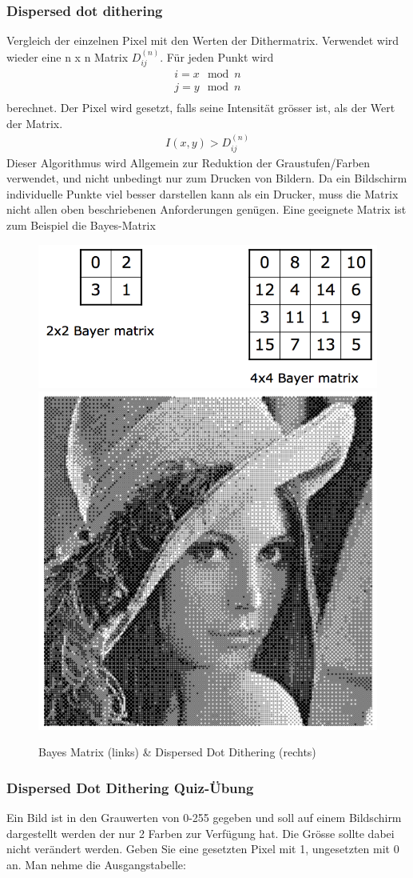 \subsubsection{Dispersed dot dithering} 
Vergleich der einzelnen Pixel mit den Werten der Dithermatrix.
Verwendet wird wieder eine n x n Matrix \(D_{ij}^{(n)}\). Für jeden Punkt wird
\begin{gather*}
i = x \mod n\\
j = y \mod n\\
\end{gather*}                                           
berechnet. Der Pixel wird gesetzt, falls seine Intensität grösser ist, als der Wert der Matrix.
\begin{gather*}
I(x,y) > D_{ij}^{(n)}   
\end{gather*}
Dieser Algorithmus wird Allgemein zur Reduktion der Graustufen/Farben verwendet, und nicht unbedingt nur zum Drucken von Bildern. Da ein Bildschirm individuelle Punkte viel besser darstellen kann als ein Drucker, muss die Matrix nicht allen oben beschriebenen Anforderungen genügen. Eine geeignete Matrix ist zum Beispiel die Bayes-Matrix
\begin{figure}[!ht]
\centering
\includegraphics[width=0.5\linewidth]{fig/bayesmatrix}
\includegraphics[width=0.3\linewidth]{fig/disperseddot}
\caption{Bayes Matrix (links) \& Dispersed Dot Dithering (rechts)}
\label{fig:bayesmatrix}
\end{figure}


\subsubsection{Dispersed Dot Dithering Quiz-Übung}
Ein Bild ist in den Grauwerten von 0-255 gegeben und soll auf einem Bildschirm dargestellt werden der nur 2 Farben zur Verfügung hat. Die Grösse sollte dabei nicht verändert werden. Geben Sie eine gesetzten Pixel mit 1, ungesetzten mit 0 an. Man nehme die Ausgangstabelle:

